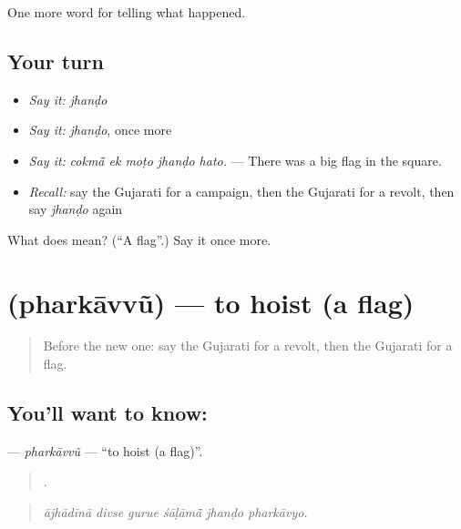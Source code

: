 \begin{grammarlens}[title={What you've built}]
One more word for telling what happened.
\end{grammarlens}

\subsection*{Your turn}
\begin{itemize}
\raggedright
  \item \emph{Say it:} \emph{jhanḍo}
  \item \emph{Say it:} \emph{jhanḍo}, once more
  \item \emph{Say it:} \emph{cokmā̃ ek moṭo jhanḍo hato.} — There was a big flag in the square.
  \item \emph{Recall:} say the Gujarati for a campaign, then the Gujarati for a revolt, then say \emph{jhanḍo} again
\end{itemize}

\begin{tcolorbox}[breakable,colback=teal!4,colframe=teal!35!black,title={Before you move on}]
What does  mean? (\textquotedblleft{}A flag\textquotedblright{}.) Say it once more.
\end{tcolorbox}
\section[\texorpdfstring{\gu{ફરકાવવું} (pharkāvvũ)}{ફરકાવવું (pharkāvvũ)}]{ (pharkāvvũ) — to hoist (a flag)}

\label{lesson:GU-C326-pharkavvu}



\begin{quote}
Before the new one: say the Gujarati for a revolt, then the Gujarati for a flag.
\end{quote}

\subsection*{You'll want to know: }
\textbf{} — \emph{pharkāvvũ} — \textquotedblleft{}to hoist (a flag)\textquotedblright{}.

\begin{quote}
     .
\end{quote}

\begin{quote}
\emph{ājhādīnā divse gurue śāḷāmā̃ jhanḍo pharkāvyo.}
\end{quote}

